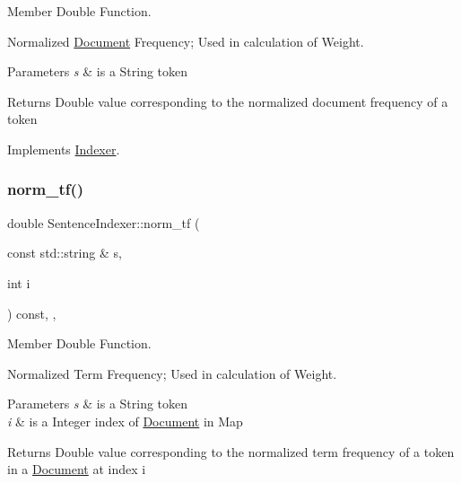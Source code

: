 Member Double Function. 

Normalized \hyperlink{class_document}{Document} Frequency; Used in calculation of Weight.


\begin{DoxyParams}{Parameters}
{\em s} & is a String token \\
\hline
\end{DoxyParams}
\begin{DoxyReturn}{Returns}
Double value corresponding to the normalized document frequency of a token 
\end{DoxyReturn}


Implements \hyperlink{class_indexer_af71c69a4267217969f21cba44822f263}{Indexer}.

\mbox{\label{class_sentence_indexer_ada837ec334535e133c9ec511b369abfa}} 
\subsubsection{\texorpdfstring{norm\+\_\+tf()}{norm\_tf()}}
{\footnotesize\ttfamily double Sentence\+Indexer\+::norm\+\_\+tf (\begin{DoxyParamCaption}\item[{const std\+::string \&}]{s,  }\item[{int}]{i }\end{DoxyParamCaption}) const\hspace{0.3cm}{\ttfamily [override]}, {\ttfamily [private]}, {\ttfamily [virtual]}}



Member Double Function. 

Normalized Term Frequency; Used in calculation of Weight.


\begin{DoxyParams}{Parameters}
{\em s} & is a String token \\
\hline
{\em i} & is a Integer index of \hyperlink{class_document}{Document} in Map \\
\hline
\end{DoxyParams}
\begin{DoxyReturn}{Returns}
Double value corresponding to the normalized term frequency of a token in a \hyperlink{class_document}{Document} at index i 
\end{DoxyReturn}


